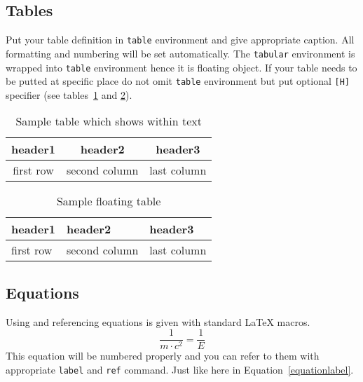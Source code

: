 \documentclass{rgg}
\begin{document}
  \subsection{Tables}
    Put your table definition in 
    \texttt{table} environment and give appropriate caption.
    All formatting and numbering will be set automatically.
    The \texttt{tabular} environment is wrapped into 
    \texttt{table} environment hence it is floating object.
    If your table needs to be putted at specific place
    do not omit \texttt{table} environment but put
    optional \texttt{[H]} specifier
    (see tables~\ref{labelforheretable} and \ref{labelforgloatingtable}).

    \begin{table}[H]
      \caption{Sample table which shows within text}
      \label{labelforheretable}
      \begin{tabular}{ccc}
        \toprule
        header1 & header2 & header3 \\
        \midrule
        first row  & second column & last column \\
        \bottomrule
      \end{tabular}
    \end{table}

    \begin{table}[b]
      \caption{Sample floating table}
      \label{labelforgloatingtable}
      \begin{tabular}{@{}lll@{}}
        \toprule
        header1 & header2 & header3 \\
        \midrule
        first row  & second column & last column \\
        \bottomrule
      \end{tabular}
    \end{table}

  \subsection{Equations}
    Using and referencing equations 
    is given with standard \LaTeX{} macros.
    \begin{equation}
      \frac{1}{m\cdot c^2} = \frac{1}{E}
      \label{equationlabel}
    \end{equation}
    This equation will be numbered properly and you
    can refer to them with appropriate
    \texttt{label} and \texttt{ref} command.
    Just like here in Equation~\ref{equationlabel}.
\end{document}
